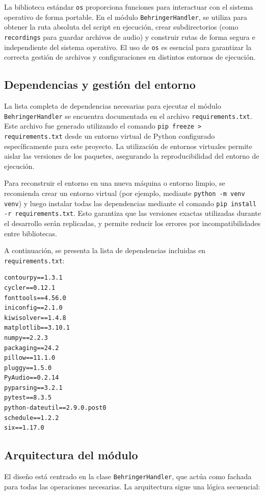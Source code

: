 La biblioteca estándar \texttt{os} proporciona funciones para interactuar con el sistema operativo de forma portable. En el módulo \texttt{BehringerHandler}, se utiliza para obtener la ruta absoluta del script en ejecución, crear subdirectorios (como \texttt{recordings} para guardar archivos de audio) y construir rutas de forma segura e independiente del sistema operativo.  El uso de \texttt{os} es esencial para garantizar la correcta gestión de archivos y configuraciones en distintos entornos de ejecución.

\subsection{Dependencias y gestión del entorno}

La lista completa de dependencias necesarias para ejecutar el módulo \texttt{BehringerHandler} se encuentra documentada en el archivo \texttt{requirements.txt}. Este archivo fue generado utilizando el comando \texttt{pip freeze > requirements.txt} desde un entorno virtual de Python configurado específicamente para este proyecto. La utilización de entornos virtuales permite aislar las versiones de los paquetes, asegurando la reproducibilidad del entorno de ejecución.

Para reconstruir el entorno en una nueva máquina o entorno limpio, se recomienda crear un entorno virtual (por ejemplo, mediante \texttt{python -m venv venv}) y luego instalar todas las dependencias mediante el comando \texttt{pip install -r requirements.txt}. Esto garantiza que las versiones exactas utilizadas durante el desarrollo serán replicadas, y permite reducir los  errores por incompatibilidades entre bibliotecas.

A continuación, se presenta la lista de dependencias incluidas en \texttt{requirements.txt}:

\begin{verbatim}
contourpy==1.3.1
cycler==0.12.1
fonttools==4.56.0
iniconfig==2.1.0
kiwisolver==1.4.8
matplotlib==3.10.1
numpy==2.2.3
packaging==24.2
pillow==11.1.0
pluggy==1.5.0
PyAudio==0.2.14
pyparsing==3.2.1
pytest==8.3.5
python-dateutil==2.9.0.post0
schedule==1.2.2
six==1.17.0
\end{verbatim}


\subsection{Arquitectura del módulo}

El diseño está centrado en la clase \texttt{BehringerHandler}, que actúa como fachada para todas las operaciones necesarias. La arquitectura sigue una lógica secuencial:

